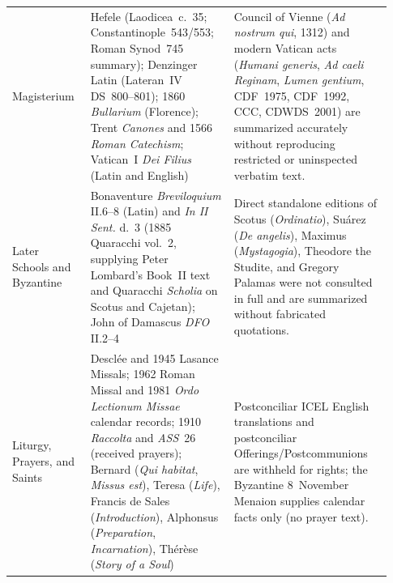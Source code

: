 {\begin{longtable}{>{\bfseries\raggedright\arraybackslash}p{0.19\linewidth}>{\raggedright\arraybackslash}p{0.35\linewidth}>{\raggedright\arraybackslash}p{0.39\linewidth}}
\addlinespace[2pt]
Magisterium & Hefele (Laodicea~c.~35; Constantinople~543/553; Roman Synod~745 summary); Denzinger Latin (Lateran~IV DS~800--801); 1860 \emph{Bullarium} (Florence); Trent \emph{Canones} and 1566 \emph{Roman Catechism}; Vatican~I \emph{Dei Filius} (Latin and English) & Council of Vienne (\emph{Ad nostrum qui}, 1312) and modern Vatican acts (\emph{Humani generis}, \emph{Ad caeli Reginam}, \emph{Lumen gentium}, CDF~1975, CDF~1992, CCC, CDWDS~2001) are summarized accurately without reproducing restricted or uninspected verbatim text. \\
\addlinespace[2pt]
Later Schools and Byzantine & Bonaventure \emph{Breviloquium} II.6--8 (Latin) and \emph{In II Sent.} d.~3 (1885 Quaracchi vol.~2, supplying Peter Lombard's Book~II text and Quaracchi \emph{Scholia} on Scotus and Cajetan); John of Damascus \emph{DFO} II.2--4 & Direct standalone editions of Scotus (\emph{Ordinatio}), Su\'arez (\emph{De angelis}), Maximus (\emph{Mystagogia}), Theodore the Studite, and Gregory Palamas were not consulted in full and are summarized without fabricated quotations. \\
\addlinespace[2pt]
Liturgy, Prayers, and Saints & 1889 Descl\'ee and 1945 Lasance Missals; 1962 Roman Missal and 1981 \emph{Ordo Lectionum Missae} calendar records; 1910 \emph{Raccolta} and \emph{ASS}~26 (received prayers); Bernard (\emph{Qui habitat}, \emph{Missus est}), Teresa (\emph{Life}), Francis de Sales (\emph{Introduction}), Alphonsus (\emph{Preparation}, \emph{Incarnation}), Th\'er\`ese (\emph{Story of a Soul}) & Postconciliar ICEL English translations and postconciliar Offerings/Postcommunions are withheld for rights; the Byzantine 8~November Menaion supplies calendar facts only (no prayer text). \\
\end{longtable}
}
